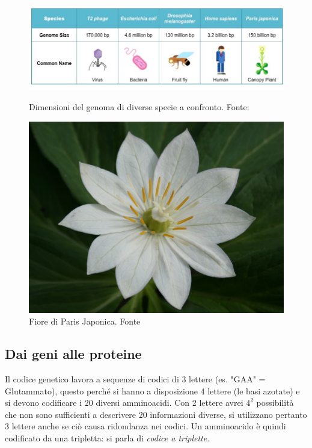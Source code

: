 \begin{figure}[!htb]
	\centering
	\includegraphics[scale=0.35]{images/genome-size-table_med.jpeg}
	\caption{Dimensioni del genoma di diverse specie a confronto. Fonte: \cite{genomeSizeBioNinja}}
	\label{fig:genome-size}
	\endminipage\hfill
	\centering
	\includegraphics[scale=0.1]{images/Paris-japonica.jpg}
	\caption{Fiore di Paris Japonica. Fonte \cite{Pariswiki}}
	\label{fig:paris-japonica}
	\endminipage\hfill
\end{figure}

\subsection{Dai geni alle proteine}

Il codice genetico lavora a sequenze di codici di 3 lettere (es. "GAA" = Glutammato), questo perché si hanno a disposizione 4 lettere (le basi azotate) e si devono codificare i 20 diversi amminoacidi. Con 2 lettere avrei $4^{2}$ possibilità che non sono sufficienti a descrivere 20 informazioni diverse, si utilizzano pertanto 3 lettere anche se ciò causa ridondanza nei codici. Un amminoacido è quindi codificato da una tripletta: si parla di \textit{codice a triplette}. \\

